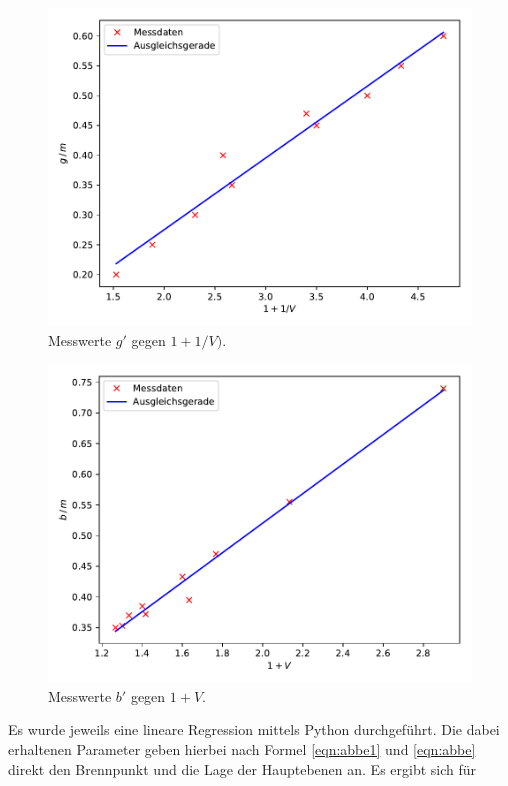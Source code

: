 \begin{figure}
  \centering
  \includegraphics{content/plot2.pdf}
  \caption{Messwerte $g'$ gegen $1+1/V)$.}
  \label{fig:plot2}
\end{figure}

\begin{figure}
  \centering
  \includegraphics{content/plot3.pdf}
  \caption{Messwerte $b'$ gegen $1+V$.}
  \label{fig:plot3}
\end{figure}

Es wurde jeweils eine lineare Regression mittels Python durchgeführt. Die dabei erhaltenen Parameter 
geben hierbei nach Formel \eqref{eqn:abbe1} und \eqref{eqn:abbe} direkt den Brennpunkt und die Lage der Hauptebenen an. Es ergibt sich
für 

